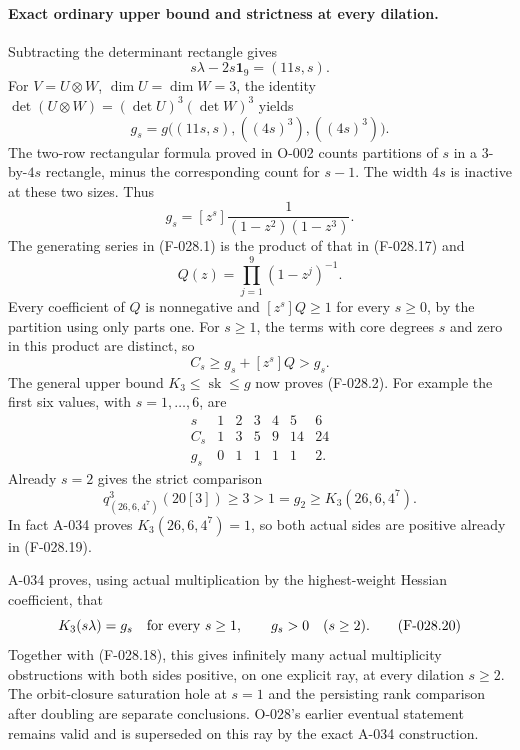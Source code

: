 \paragraph{Exact ordinary upper bound and strictness at every dilation.}
Subtracting the determinant rectangle gives
\[
                s\lambda-2s\mathbf1_9=(11s,s).
 \]
For \(V=U\otimes W\), \(\dim U=\dim W=3\), the identity
\(\det(U\otimes W)=(\det U)^3(\det W)^3\) yields
\[
 g_s=g\bigl((11s,s),((4s)^3),((4s)^3)\bigr).
                                                               \tag{F-028.16}
\]
The two-row rectangular formula proved in O-002 counts
partitions of \(s\) in a \(3\)-by-\(4s\) rectangle,
minus the corresponding count for \(s-1\).
The width \(4s\) is inactive at these two sizes.
Thus
\[
                        g_s=[z^s]\frac1{(1-z^2)(1-z^3)}.
                                                               \tag{F-028.17}
\]
The generating series in (F-028.1) is the product of
that in (F-028.17) and
\[
                           Q(z)=\prod_{j=1}^{9}(1-z^j)^{-1}.
 \]
Every coefficient of \(Q\) is nonnegative and
\([z^s]Q\geq1\) for every \(s\geq0\), by the partition
using only parts one. For \(s\geq1\), the terms with
core degrees \(s\) and zero in this product are distinct,
so
\[
                              C_s\geq g_s+[z^s]Q>g_s.
                                                               \tag{F-028.18}
\]
The general upper bound \(K_3\leq\operatorname{sk}\leq g\)
now proves (F-028.2).
For example the first six values, with \(s=1,\ldots,6\), are
\[
 \begin{array}{c|rrrrrr}
 s&1&2&3&4&5&6\\ \hline
 C_s&1&3&5&9&14&24\\
 g_s&0&1&1&1&1&2 .
 \end{array}
\]
Already \(s=2\) gives the strict comparison
\[
              q^3_{(26,6,4^7)}(20[3])\geq3>1=g_2
                         \geq K_3(26,6,4^7).
                                                               \tag{F-028.19}
\]
In fact A-034 proves \(K_3(26,6,4^7)=1\), so both
actual sides are positive already in (F-028.19).

A-034 proves, using actual multiplication by the
highest-weight Hessian coefficient, that
\[
                    K_3(s\lambda)=g_s
                      \quad\hbox{for every }s\geq1,
             \qquad g_s>0\quad(s\geq2).
                                                               \tag{F-028.20}
\]
Together with (F-028.18), this gives infinitely many
actual multiplicity obstructions with both sides positive,
on one explicit ray, at every dilation \(s\geq2\).
The orbit-closure saturation hole at \(s=1\) and the
persisting rank comparison after doubling are separate conclusions.
O-028's earlier eventual statement remains valid and
is superseded on this ray by the exact A-034 construction.

